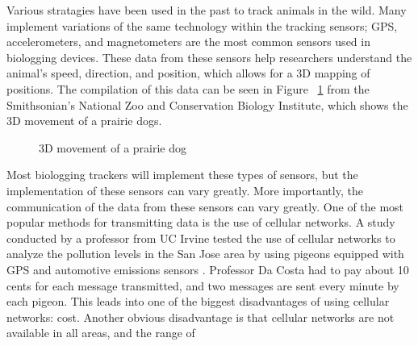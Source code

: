\documentclass[sigplan,screen,nonacm]{acmart}
\begin{document}
Various stratagies have been used in the past to track animals in the wild. Many
implement variations of the same technology within the tracking sensors;
GPS, accelerometers, and magnetometers are the most common sensors used in
biologging devices. These data from these sensors help researchers understand
the animal's  speed, direction, and position, which allows for a 3D mapping of
positions\cite{Kidangoor_2024}. The compilation of this data can be seen in Figure ~\ref{fig:prairie_dog_3D_movement}
from the Smithsonian's National Zoo and Conservation Biology Institute, which
shows the 3D movement of a prairie dogs.
\begin{figure}[htbp]
  \centering
  \caption{3D movement of a prairie dog \cite{Kidangoor_2024}}
  \label{fig:prairie_dog_3D_movement}
\end{figure}
Most biologging trackers will implement these types of sensors, but the
implementation of these sensors can vary greatly. More importantly, the
communication of the data from these sensors can vary greatly. One of the
most popular methods for transmitting data is the use of cellular networks.
A study conducted by a professor from UC Irvine tested the use of cellular
networks to analyze the pollution levels in the San Jose area by using pigeons
equipped with GPS and automotive emissions sensors \cite{Martin_2006}. Professor
Da Costa had to pay about 10 cents for each message transmitted, and two
messages are sent every minute by each pigeon\cite{Martin_2006}. This leads into one of the biggest
disadvantages of using cellular networks: cost. Another obvious disadvantage
is that cellular networks are not available in all areas, and the range of
\end{document}

